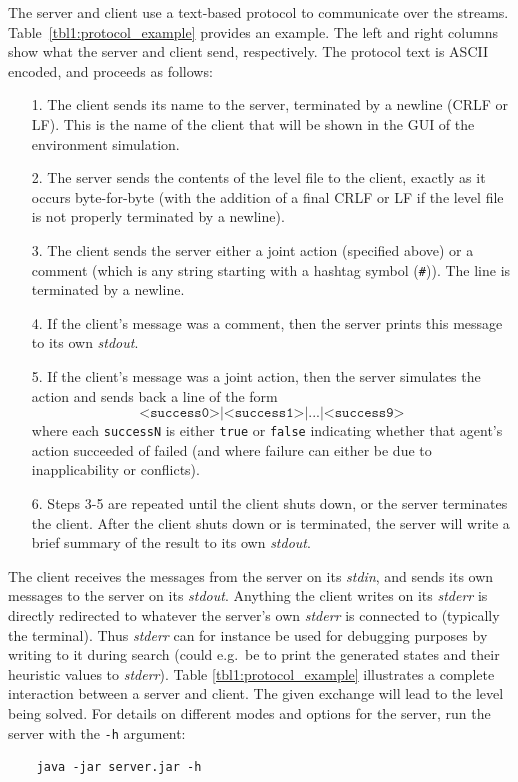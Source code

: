 \documentclass[12pt,a4paper]{article}
\begin{document}
The server and client use a text-based protocol to communicate over the streams. Table~\ref{tbl1:protocol_example} provides an example. The left and right columns show what the server and client send, respectively. The protocol text is ASCII encoded, and proceeds as follows: 
\begin{enumerate}
\item[1.] The client sends its name to the server, terminated by a newline (CRLF or LF). This is the name of the client that will be shown in the GUI of the environment simulation.
\item[2.] The server sends the contents of the level file to the client, exactly as it occurs byte-for-byte (with the addition of a final CRLF or LF if the level file is not properly terminated by a newline).
\item[3.] The client sends the server either a joint action (specified above) or a comment (which is any string starting with a hashtag symbol (\texttt{\#})). The line is terminated by a newline.
\item[4.] If the client's message was a comment, then the server prints this message to its own \emph{stdout}.
\item[5.] If the client's message was a joint action, then the server simulates the action and sends back a line of the form
\[
   \texttt{<success0>|<success1>|...|<success9>}
\]
where each \texttt{successN} is either \texttt{true} or \texttt{false} indicating whether that agent's action succeeded of failed (and where failure can either be due to inapplicability or conflicts).
\item[6.] Steps 3-5 are repeated until the client shuts down, or the server terminates the client. After the client shuts down or is terminated, the server will write a brief summary of the result to its own \emph{stdout}.
\end{enumerate}

The client receives the messages from the server on its \emph{stdin}, and sends its own messages to the server on its \emph{stdout}. Anything the client writes on its \emph{stderr} is directly redirected to whatever the server's own \emph{stderr} is connected to (typically the terminal). Thus \emph{stderr} can for instance be used for debugging purposes by writing to it during search (could e.g.\ be to print the generated states and their heuristic values to \emph{stderr}). Table \ref{tbl1:protocol_example} illustrates a complete interaction between a server and client. The given exchange will lead to the level being solved. For details on different modes and options for the server, run the server with the \texttt{-h} argument:
\begin{verbatim}
    java -jar server.jar -h
\end{verbatim}
\end{document}
